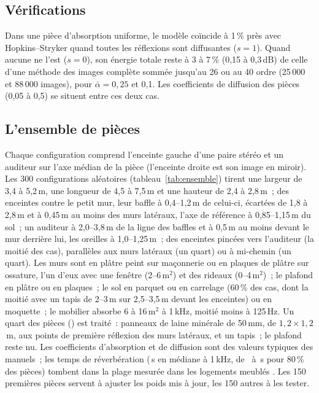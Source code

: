 \documentclass[11pt,a4paper]{article}
\begin{document}
\subsection{Vérifications}

Dans une pièce d'absorption uniforme, le modèle coïncide à 1\,\% près avec Hopkins--Stryker quand toutes
les réflexions sont diffusantes ($s = 1$). Quand aucune ne l'est ($s = 0$), son énergie totale reste à 3
à 7\,\% (0,15 à 0,3\,dB) de celle d'une méthode des images complète sommée jusqu'au 26\ieme{} ou au
40\ieme{} ordre (25\,000 et 88\,000 images), pour $\bar\alpha = 0,25$ et 0,1. Les coefficients de
diffusion des pièces (0,05 à 0,5) se situent entre ces deux cas.

\subsection{L'ensemble de pièces}

Chaque configuration comprend l'enceinte gauche d'une paire stéréo et un auditeur sur l'axe médian de
la pièce (l'enceinte droite est son image en miroir). Les 300 configurations aléatoires
(tableau~\ref{tab:ensemble}) tirent une largeur de 3,4 à 5,2\,m, une longueur de 4,5 à 7,5\,m et une
hauteur de 2,4 à 2,8\,m~; des enceintes contre le petit mur, leur baffle à 0,4--1,2\,m de celui-ci,
écartées de 1,8 à 2,8\,m et à 0,45\,m au moins des murs latéraux, l'axe de référence à 0,85--1,15\,m du
sol~; un auditeur à 2,0--3,8\,m de la ligne des baffles et à 0,5\,m au moins devant le mur derrière lui,
les oreilles à 1,0--1,25\,m~; des enceintes pincées vers l'auditeur (la moitié des cas), parallèles aux
murs latéraux (un quart) ou à mi-chemin (un quart). Les murs sont en plâtre peint sur maçonnerie ou en
plaques de plâtre sur ossature, l'un d'eux avec une fenêtre (2--6\,m$^2$) et des rideaux (0--4\,m$^2$)~;
le plafond en plâtre ou en plaques~; le sol en parquet ou en carrelage (60\,\% des cas, dont la moitié
avec un tapis de 2--3\,m sur 2,5--3,5\,m devant les enceintes) ou en moquette~; le mobilier absorbe 6 à
16\,m$^2$ à 1\,kHz, moitié moins à 125\,Hz. Un quart des pièces (\ntreated) est traité~: panneaux de laine
minérale de 50\,mm, de $1,2 \times 1,2$\,m, aux points de première réflexion des murs latéraux, et un
tapis~; le plafond reste nu. Les coefficients d'absorption et de diffusion sont des valeurs typiques
des manuels~; les temps de réverbération (\nrtMedian\,s en médiane à 1\,kHz, de \nrtLo\ à \nrtHi\,s pour
80\,\% des pièces) tombent dans la plage mesurée dans les logements meublés \cite{diaz2005}. Les 150
premières pièces servent à ajuster les poids mis à jour, les 150 autres à les tester.
\end{document}
